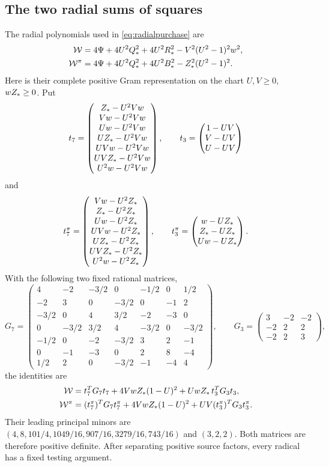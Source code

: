 \subsection*{The two radial sums of squares}
The radial polynomials used in \eqref{eq:radialpurchase} are
\begin{align}
 \mathcal W&=4\Psi+4U^2Q_*^2+4U^2R_*^2-V^2(U^2-1)^2w^2,\notag\\
 \mathcal W^\pi&=4\Psi+4U^2Q_*^2+4U^2B_*^2-Z_*^2(U^2-1)^2 .
 \label{eq:radialpolys}
\end{align}
Here is their complete positive Gram representation on the chart
$U,V\geq0$, $wZ_*\geq0$.
Put
\[
 t_7=\begin{pmatrix}
 Z_*-U^2Vw\\Vw-U^2Vw\\Uw-U^2Vw\\UZ_*-U^2Vw\\
 UVw-U^2Vw\\UVZ_*-U^2Vw\\U^2w-U^2Vw
 \end{pmatrix},\qquad
 t_3=\begin{pmatrix}1-UV\\V-UV\\U-UV\end{pmatrix}
\]
and
\[
 t_7^\pi=\begin{pmatrix}
 Vw-U^2Z_*\\Z_*-U^2Z_*\\Uw-U^2Z_*\\UVw-U^2Z_*\\
 UZ_*-U^2Z_*\\UVZ_*-U^2Z_*\\U^2w-U^2Z_*
 \end{pmatrix},\qquad
 t_3^\pi=\begin{pmatrix}w-UZ_*\\Z_*-UZ_*\\Uw-UZ_*\end{pmatrix}.
\]
With the following two fixed rational matrices,
\[
 G_7=\begin{pmatrix}
4&-2&-3/2&0&-1/2&0&1/2\\
-2&3&0&-3/2&0&-1&2\\
-3/2&0&4&3/2&-2&-3&0\\
0&-3/2&3/2&4&-3/2&0&-3/2\\
-1/2&0&-2&-3/2&3&2&-1\\
0&-1&-3&0&2&8&-4\\
1/2&2&0&-3/2&-1&-4&4
\end{pmatrix},\qquad
 G_3=\begin{pmatrix}3&-2&-2\\-2&2&2\\-2&2&3\end{pmatrix},
\]
the identities are
\begin{align}
 \mathcal W&=t_7^TG_7t_7+4VwZ_*(1-U)^2+UwZ_*\,t_3^TG_3t_3,\notag\\
 \mathcal W^\pi&=(t_7^\pi)^TG_7t_7^\pi+4VwZ_*(1-U)^2
                                      +UV(t_3^\pi)^TG_3t_3^\pi .
 \label{eq:W19}
\end{align}
Their leading principal minors are
$(4,8,101/4,1049/16,907/16,3279/16,743/16)$ and $(3,2,2)$.
Both matrices are therefore positive definite. After separating positive
source factors, every radical has a fixed testing argument.

